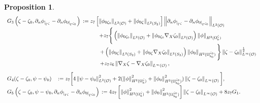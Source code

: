 \documentclass[11pt]{article}
\newtheorem{proposition}[theorem]{Proposition}
\begin{document}
\begin{proposition}
\begin{equation}
\begin{array}{ll}
			G_3\left(\zeta-\zeta_0,\partial_n\phi_{|_{\Gamma^{\zeta}}}-\partial_n\phi_{0|_{\Gamma^{\zeta_0}}}\right)&\hspace{-1.4cm}:=z_7\left[\left\Vert\phi_{0\zeta_0}\right\Vert_{L^2(\mathcal O)}+\left\Vert\phi_{0\zeta}\right\Vert_{L^2(S_2)}\right] \left\Vert\partial_n\phi_{|_{\Gamma^{\zeta}}}-\partial_n\phi_{0|_{\Gamma^{\zeta_0}}}\right\Vert_{L^2(\mathcal O )}\\
			&\hspace{-0.35cm}+z_7\Bigg\{  \left(  \left\Vert \phi_{0\zeta_0} \right\Vert_{L^2(\mathcal O)}+ \left\Vert  \phi_{0\zeta_0}\nabla_X\zeta_0\right\Vert_{L^2(\mathcal O)} \right)\left\Vert \phi  \right\Vert_{H^2(\Omega_b^{\zeta})}  \\
			&\hspace{-0.3cm}+ \left(  \left\Vert \phi_{0\zeta} \right\Vert_{L^2(S_2)}+ \left\Vert  \phi_{0\zeta} \nabla_X\zeta_0\right\Vert_{L^2(S_2)} \right)\left\Vert \phi_0  \right\Vert_{H^2(\Omega_{b_0}^{\zeta_0})}      \Bigg\}\left\Vert   \zeta-\zeta_0\right\Vert_{L^{\infty}(\mathcal O )}^{\frac{1}{2}}\\\vspace{0.3cm}
			&\hspace{-0.3cm}+z_7z_6\left\Vert\nabla_X\zeta-\nabla_X\zeta_0  \right\Vert_{L^{\infty}(\mathcal O )},\\
		 G_4(\zeta-\zeta_0,\psi-\psi_0)&\hspace{-3cm} :=z_7\bigg[4 \left\Vert \psi-\psi_0 \right\Vert_{L^{2}(\mathcal O )}^2
		+  2 (\left\Vert\phi\right\Vert_{H^2(\Omega_b^{\zeta})}^2+\left\Vert\phi_0\right\Vert_{H^2(\Omega_{b_0}^{\zeta_0})}^2)\left\Vert\zeta-\zeta_0\right\Vert_{L^{\infty}(\mathcal O )} \bigg],  \\   \vspace{0.3cm}
		G_5\left(\zeta-\zeta_0,\psi-\psi_0,\partial_n\phi_{|_{\Gamma^{\zeta}}}-\partial_n\phi_{0|_{\Gamma^{\zeta_0}}}\right)&\hspace{-0.2cm} 
		:=4z_7\left[  \left\Vert  \phi \right\Vert_{H^2(\Omega_{b}^{\zeta})}^2+   \left\Vert  \phi_0 \right\Vert_{H^2(\Omega_{b_0}^{\zeta_0})}^2 \right]\left\Vert   \zeta-\zeta_0\right\Vert_{L^{\infty}(\mathcal O )}  +8z_7 G_1.
		\end{array}
	\end{equation}
	

\end{proposition}
\end{document}
